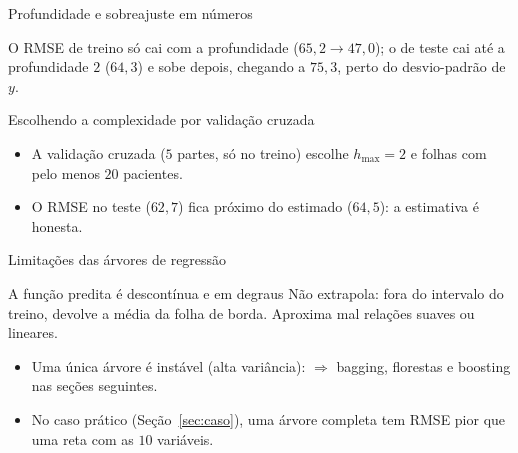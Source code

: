 \begin{frame}[fragile]{Profundidade e sobreajuste em números}

\vspace{3pt}

\vspace{3pt}
{\small O RMSE de \alert{treino} só cai com a profundidade ($65{,}2\to47{,}0$); o de \alert{teste} cai até a profundidade $2$ ($64{,}3$) e sobe depois, chegando a $75{,}3$, perto do desvio-padrão de $y$.}
\end{frame}

\begin{frame}[fragile]{Escolhendo a complexidade por validação cruzada}

\vspace{3pt}

\vspace{3pt}
\begin{itemize}
  \item A validação cruzada ($5$ partes, só no treino) escolhe $h_{\max}=2$ e folhas com pelo menos $20$ pacientes.
  \item O RMSE no teste ($62{,}7$) fica próximo do estimado ($64{,}5$): a estimativa é honesta.
\end{itemize}
\end{frame}

\begin{frame}{Limitações das árvores de regressão}
\begin{block}{A função predita é descontínua e em degraus}
Não \alert{extrapola}: fora do intervalo do treino, devolve a média da folha de borda. Aproxima mal relações suaves ou lineares.
\end{block}
\begin{itemize}
  \item Uma única árvore é \alert{instável} (alta variância): $\Rightarrow$ bagging, florestas e boosting nas seções seguintes.
  \item No caso prático (Seção~\ref{sec:caso}), uma árvore completa tem RMSE \alert{pior} que uma reta com as $10$ variáveis.
\end{itemize}
\end{frame}
